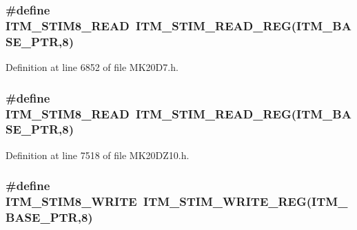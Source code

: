 \subsubsection[{\texorpdfstring{I\+T\+M\+\_\+\+S\+T\+I\+M8\+\_\+\+R\+E\+AD}{ITM_STIM8_READ}}]{\setlength{\rightskip}{0pt plus 5cm}\#define I\+T\+M\+\_\+\+S\+T\+I\+M8\+\_\+\+R\+E\+AD~{\bf I\+T\+M\+\_\+\+S\+T\+I\+M\+\_\+\+R\+E\+A\+D\+\_\+\+R\+EG}({\bf I\+T\+M\+\_\+\+B\+A\+S\+E\+\_\+\+P\+TR},8)}\hypertarget{group___i_t_m___register___accessor___macros_ga84e344ea9bb6dd044130f918d1cd3f59}{}\label{group___i_t_m___register___accessor___macros_ga84e344ea9bb6dd044130f918d1cd3f59}


Definition at line 6852 of file M\+K20\+D7.\+h.

\subsubsection[{\texorpdfstring{I\+T\+M\+\_\+\+S\+T\+I\+M8\+\_\+\+R\+E\+AD}{ITM_STIM8_READ}}]{\setlength{\rightskip}{0pt plus 5cm}\#define I\+T\+M\+\_\+\+S\+T\+I\+M8\+\_\+\+R\+E\+AD~{\bf I\+T\+M\+\_\+\+S\+T\+I\+M\+\_\+\+R\+E\+A\+D\+\_\+\+R\+EG}({\bf I\+T\+M\+\_\+\+B\+A\+S\+E\+\_\+\+P\+TR},8)}\hypertarget{group___i_t_m___register___accessor___macros_ga84e344ea9bb6dd044130f918d1cd3f59}{}\label{group___i_t_m___register___accessor___macros_ga84e344ea9bb6dd044130f918d1cd3f59}


Definition at line 7518 of file M\+K20\+D\+Z10.\+h.

\subsubsection[{\texorpdfstring{I\+T\+M\+\_\+\+S\+T\+I\+M8\+\_\+\+W\+R\+I\+TE}{ITM_STIM8_WRITE}}]{\setlength{\rightskip}{0pt plus 5cm}\#define I\+T\+M\+\_\+\+S\+T\+I\+M8\+\_\+\+W\+R\+I\+TE~{\bf I\+T\+M\+\_\+\+S\+T\+I\+M\+\_\+\+W\+R\+I\+T\+E\+\_\+\+R\+EG}({\bf I\+T\+M\+\_\+\+B\+A\+S\+E\+\_\+\+P\+TR},8)}\hypertarget{group___i_t_m___register___accessor___macros_ga90288fe5645ad72d65bcf25a4e48cc23}{}\label{group___i_t_m___register___accessor___macros_ga90288fe5645ad72d65bcf25a4e48cc23}


